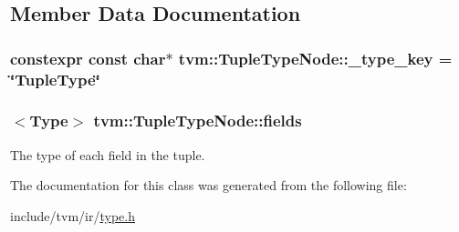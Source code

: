 \subsection{Member Data Documentation}
\subsubsection[{\texorpdfstring{\+\_\+type\+\_\+key}{_type_key}}]{\setlength{\rightskip}{0pt plus 5cm}constexpr const char$\ast$ tvm\+::\+Tuple\+Type\+Node\+::\+\_\+type\+\_\+key = \char`\"{}Tuple\+Type\char`\"{}\hspace{0.3cm}{\ttfamily [static]}}\hypertarget{classtvm_1_1TupleTypeNode_a2bbcc4fc888b49b6d78a3b123ac686ba}{}\label{classtvm_1_1TupleTypeNode_a2bbcc4fc888b49b6d78a3b123ac686ba}
\subsubsection[{\texorpdfstring{fields}{fields}}]{$<${\bf Type}$>$ tvm\+::\+Tuple\+Type\+Node\+::fields}\hypertarget{classtvm_1_1TupleTypeNode_a2ac43b6c2f0f90ce64e8c3a213568021}{}\label{classtvm_1_1TupleTypeNode_a2ac43b6c2f0f90ce64e8c3a213568021}


The type of each field in the tuple. 



The documentation for this class was generated from the following file\+:\begin{DoxyCompactItemize}
\item 
include/tvm/ir/\hyperlink{ir_2type_8h}{type.\+h}\end{DoxyCompactItemize}
